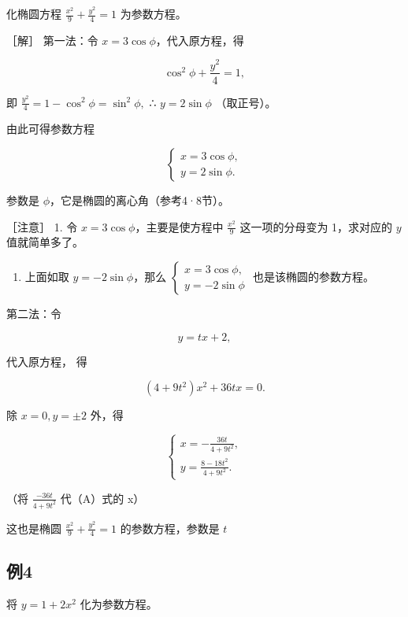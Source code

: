 化椭圆方程 \(\frac{x^2}{9} + \frac{y^2}{4} = 1\) 为参数方程。

［解］ 第一法：令 \(x = 3\cos \phi\)，代入原方程，得

\[
\cos^{2} \phi + \frac {y^{2}}{4} = 1,
\]

即 \(\frac{y^2}{4} = 1 - \cos^2\phi = \sin^2\phi ,\) ∴ \(y=2\sin\phi\)
（取正号）。

由此可得参数方程

\[
\left\{ \begin{array}{l} x = 3 \cos \phi, \\ y = 2 \sin \phi. \end{array} \right. \tag {1}
\]

参数是 \(\phi\)，它是椭圆的离心角（参考4·8节）。

［注意］ 1. 令 \(x = 3\cos \phi\)，主要是使方程中 \(\frac{x^2}{9}\)
这一项的分母变为 1，求对应的 \(y\) 值就简单多了。

\begin{enumerate}
\def\labelenumi{\arabic{enumi}.}
\setcounter{enumi}{1}
\tightlist
\item
  上面如取 \(y = -2\sin \phi\)，那么
  \(\left\{ \begin{array}{l} x = 3\cos \phi, \\ y = -2\sin \phi \end{array} \right.\)
  也是该椭圆的参数方程。
\end{enumerate}

第二法：令

\[
y = t x + 2, \tag {A}
\]

代入原方程， 得

\[
(4 + 9 t^{2}) x^{2} + 36 t x = 0.
\]

除 \(x = 0, y = \pm 2\) 外，得

\[
\left\{ \begin{array}{l} x = - \frac {36 t}{4 + 9 t^{2}}, \\ y = \frac {8 - 18 t^{2}}{4 + 9 t^{2}}. \end{array} \right. \tag {2}
\]

（将 \(\frac{-36t}{4+9t^{2}}\) 代（A）式的 x）

这也是椭圆 \(\frac{x^2}{9} +\frac{y^2}{4} = 1\) 的参数方程，参数是 \(t\)

\subsection{例4}\label{ux4f8b4-20}

将 \(y = 1 + 2x^{2}\) 化为参数方程。

